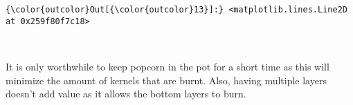 \documentclass[11pt]{article}
\begin{document}
\begin{Verbatim}[commandchars=\\\{\}]
{\color{outcolor}Out[{\color{outcolor}13}]:} <matplotlib.lines.Line2D at 0x259f80f7c18>
\end{Verbatim}
            
    \begin{center}
    \end{center}
    { \hspace*{\fill} \\}
    
    It is only worthwhile to keep popcorn in the pot for a short time as
this will minimize the amount of kernels that are burnt. Also, having
multiple layers doesn't add value as it allows the bottom layers to
burn.


    
    
    
    
\end{document}
